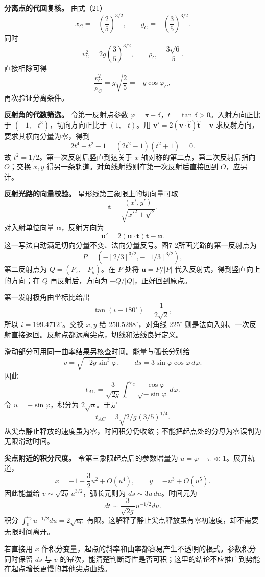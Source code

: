 \documentclass[12pt,a4paper,UTF8]{ctexart}
\begin{document}
\textbf{分离点的代回复核。} 由式（21） \[
x_C=-\left(\frac25\right)^{3/2},\qquad
y_C=-\left(\frac35\right)^{3/2}.
\] 同时 \[
v_C^2=2g\left(\frac35\right)^{3/2},
\qquad
\rho_C=\frac{3\sqrt6}{5}.
\] 直接相除可得 \[
\frac{v_C^2}{\rho_C}=g\sqrt{\frac25}
=-g\cos\varphi_C,
\] 再次验证分离条件。

\textbf{反射角的代数筛选。} 令第一反射点参数
\(\varphi=\pi+\delta\)，\(t=\tan\delta>0\)。入射方向正比于
\((-1,-t^3)\)，切向方向正比于 \((1,-t)\)。用
\(\bm v'=2(\bm v\cdot\hat{\bm t})\hat{\bm t}-\bm v\)
求反射方向，要求其横向分量为零，得到 \[
2t^4+t^2-1=(2t^2-1)(t^2+1)=0.
\] 故 \(t^2=1/2\)。第一次反射后竖直到达关于 \(x\)
轴对称的第二点，第二次反射后指向 \(O\)；交换 \(x,y\)
得另一条轨道。对角线射线则在第一次反射后直接回到 \(O\)，应另计。

\textbf{反射光路的向量校验。} 星形线第三象限上的切向量可取 \[
\bm t=\frac{(x',y')}{\sqrt{x'^2+y'^2}}.
\] 对入射单位向量 \(\bm u\)，反射方向为 \[
\bm u'=2(\bm u\cdot\bm t)\bm t-\bm u.
\]
这一写法自动满足切向分量不变、法向分量反号。图7-2所画光路的第一反射点为
\[
P=(-[2/3]^{3/2},-[1/3]^{3/2}),
\] 第二反射点为 \(Q=(P_x,-P_y)\)。在 \(P\) 处将 \(\bm u=P/|P|\)
代入反射式，得到竖直向上的方向；在 \(Q\) 再反射后，方向为
\(-Q/|Q|\)，正好回到原点。

第一发射极角由坐标比给出 \[
\tan(i-180^\circ)=\frac1{2\sqrt2},
\] 所以 \(i=199.4712^\circ\)。交换 \(x,y\) 给 \(250.5288^\circ\)，对角线
\(225^\circ\)
则是法向入射、一次反射直接返回。反射点都远离尖点，切线和法线良好定义。

滑动部分可用同一曲率结果另核查时间。能量与弧长分别给 \[
v=\sqrt{-2g\sin^3\varphi},\qquad ds=3\sin\varphi\cos\varphi\,d\varphi.
\] 因此 \[
t_{AC}=\frac3{\sqrt{2g}}\int_\pi^{\varphi_C}\frac{-\cos\varphi}{\sqrt{-\sin\varphi}}\,d\varphi.
\] 令 \(u=-\sin\varphi\)，积分为 \(2\sqrt u\)。于是 \[
t_{AC}=3\sqrt{2/g}(3/5)^{1/4}.
\]
从尖点静止释放的速度虽为零，时间积分仍收敛；不能把起点处的分母为零误判为无限滑动时间。

\textbf{尖点附近的积分尺度。} 令第三象限起点后的参数增量为
\(u=\varphi-\pi\ll1\)。展开轨道， \[
x=-1+\frac32u^2+O(u^4),\qquad y=-u^3+O(u^5).
\] 因此能量给 \(v\sim\sqrt{2g}\,u^{3/2}\)，弧长元则为
\(ds\sim3u\,du\)。时间元为 \[
dt\sim\frac3{\sqrt{2g}}u^{-1/2}du.
\] 积分 \(\int_0^{u_0}u^{-1/2}du=2\sqrt{u_0}\)
有限。这解释了静止尖点释放虽有零初速度，却不需要无限时间离开。

若直接用 \(x\)
作积分变量，起点的斜率和曲率都容易产生不透明的根式。参数积分同时保留
\(ds\) 与 \(v\)
的幂次，能清楚判断奇性是否可积；这里的结论不应推广到势能在起点增长更慢的其他尖点曲线。
\end{document}
